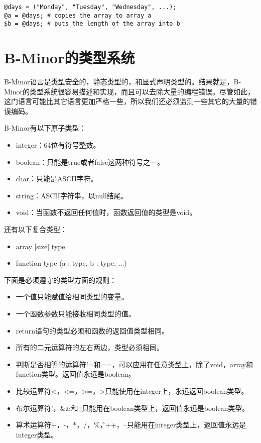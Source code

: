 \documentclass[cn,11pt,chinese]{elegantbook}
\begin{document}
\begin{verbatim}
@days = ("Monday", "Tuesday", "Wednesday", ...);
@a = @days; # copies the array to array a
$b = @days; # puts the length of the array into b
\end{verbatim}

\section{B-Minor的类型系统}

B-Minor语言是类型安全的，静态类型的，和显式声明类型的。结果就是，B-Minor的类型系统很容易描述和实现，而且可以去除大量的编程错误。尽管如此，这门语言可能比其它语言更加严格一些，所以我们还必须监测一些其它的大量的错误编码。

B-Minor有以下原子类型：

\begin{itemize}
  \item integer：64位有符号整数。
  \item boolean：只能是true或者false这两种符号之一。
  \item char：只能是ASCII字符。
  \item string：ASCII字符串，以null结尾。
  \item void：当函数不返回任何值时，函数返回值的类型是void。
\end{itemize}

还有以下复合类型：

\begin{itemize}
  \item array [size] type
  \item function type (a : type, b :  type, ...)
\end{itemize}

下面是必须遵守的类型方面的规则：

\begin{itemize}
  \item 一个值只能赋值给相同类型的变量。
  \item 一个函数参数只能接收相同类型的值。
  \item return语句的类型必须和函数的返回值类型相同。
  \item 所有的二元运算符的左右两边，类型必须相同。
  \item 判断是否相等的运算符!=和==，可以应用在任意类型上，除了void，array和function类型。返回值永远是boolean。
  \item 比较运算符<，<=，>=，>只能使用在integer上，永远返回boolean类型。
  \item 布尔运算符!，\&\&和||只能用在boolean类型上，返回值永远是boolean类型。
  \item 算术运算符+，-，*，/，\%，\^，++，--只能用在integer类型上，返回值永远是integer类型。
\end{itemize}
\end{document}
